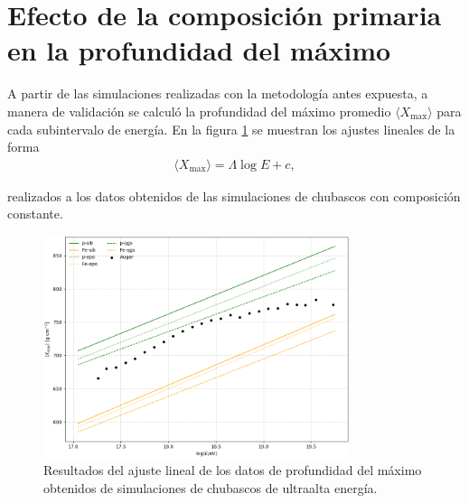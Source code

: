 %


\section{Efecto de la composición primaria en la profundidad del máximo}
A partir de las simulaciones realizadas con la metodología antes expuesta, a manera de validación se calculó la profundidad del máximo promedio $\langle X_{\text{max}} \rangle$ para cada subintervalo de energía. En la figura \ref{fig:xmax_pfe} se muestran los ajustes lineales de la forma
\begin{align}
\langle X_{\text{max}} \rangle = \Lambda \log E + c,
\end{align}

realizados a los datos obtenidos de las simulaciones de chubascos con composición constante.\\

\begin{figure}[]
\centering
\includegraphics[width=0.8\textwidth]{Figuras/Xmax_pFe_fit}
\caption{Resultados del ajuste lineal de los datos de profundidad del máximo obtenidos de simulaciones de chubascos de ultraalta energía.}
\label{fig:xmax_pfe}
\end{figure}


